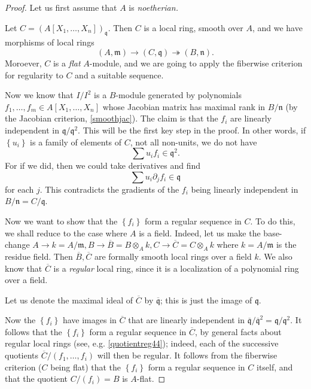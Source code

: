 \begin{proof} 
Let us first assume that $A$ is \emph{noetherian.}

Let $C = (A[X_1, \dots, X_n])_{\mathfrak{q}}$. Then $C$ is a local ring,
smooth over $A$, and we have morphisms of local rings
\[ (A, \mathfrak{m}) \to (C, \mathfrak{q}) \twoheadrightarrow (B,
\mathfrak{n}).  \]
Moroever, $C$ is a \emph{flat} $A$-module, and we are going to apply the
fiberwise criterion for regularity to $C$ and a suitable sequence.

Now we know that $I/I^2$ is a $B$-module generated by polynomials $f_1,
\dots, f_m
\in A[X_1, \dots, X_n]$
whose Jacobian matrix has maximal rank in $B/\mathfrak{n}$ (by the Jacobian
criterion, \cref{smoothjac}).
The claim is that the $f_i$ are linearly independent in
$\mathfrak{q}/\mathfrak{q}^2$. This will be the first key step in the proof.
In other words, if $\left\{u_i\right\}$ is a family of elements of $C$, not all
non-units, we do not have
\[ \sum u_i f_i \in \mathfrak{q}^2.  \]
For if we did, then we could take derivatives
and find
\[ \sum u_i \partial_j f_i \in \mathfrak{q}  \]
for each $j$. This contradicts the gradients of the $f_i$ being linearly
independent in $B/\mathfrak{n} = C/\mathfrak{q}$. 

Now we want to show that the $\left\{f_i\right\}$ form a regular sequence in
$C$. To do this, we shall reduce to the case where $A$ is a field. Indeed, let
us make the base-change $A \to k = A/\mathfrak{m}, B \to \overline{B} = B
\otimes_A k, C \to \overline{C}=C \otimes_A k$ where $k  =
A/\mathfrak{m}$ is the residue field.
Then $\overline{B},\overline{C}$ are  formally smooth local rings over a
field $k$. We also know that $\overline{C}$ is a \emph{regular} local ring,
since it is a localization of a polynomial ring over a field. 


Let us denote the maximal ideal of
$\overline{C}$ by
$\overline{\mathfrak{q}}$; this is just the image of $\mathfrak{q}$.


Now the $\left\{f_i\right\}$ have images in $\overline{C}$ that are linearly
independent
in $\overline{\mathfrak{q}}/\overline{\mathfrak{q}}^2 =
\mathfrak{q}/\mathfrak{q}^2$. It follows that the $\left\{f_i\right\}$ form a
regular sequence in $\overline{C}$, by general facts about regular local
rings (see, e.g. \cref{quotientreg44}); indeed, each of the successive quotients $\overline{C}/(f_1, \dots,
f_i)$ will then be regular.
It follows from the fiberwise criterion ($C$ being flat) that the
$\left\{f_i\right\}$ form a regular sequence in $C$ itself, and that the
quotient $C/(f_i) = B$ is $A$-flat.
\end{proof} 

